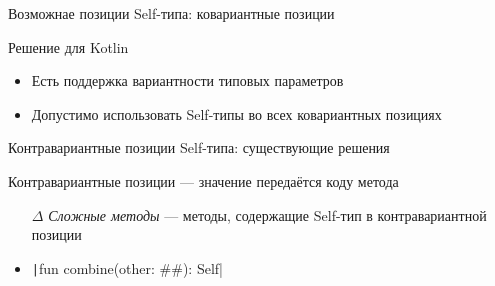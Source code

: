 \documentclass[usenames, dvipsnames]{beamer}
\begin{document}
\begin{frame}[fragile]{Возможнае позиции Self-типа: ковариантные позиции}
        \begin{block}{Решение для Kotlin}
            \begin{itemize}
                \item Есть поддержка вариантности типовых параметров
                \item Допустимо использовать Self-типы во всех ковариантных позициях
            \end{itemize}
        \end{block}
    \end{frame}

    \begin{frame}[fragile]{Контравариантные позиции Self-типа: существующие решения}

        \begin{block}{Контравариантные позиции --- значение передаётся коду метода}
            \begin{itemize}
                \item[$\Delta$] \emph{Сложные методы} --- методы, содержащие Self-тип в контравариантной позиции
                \item \texttt|fun combine(other: ##): Self| %
            \end{itemize}
        \end{block}


\end{frame}
\end{document}
